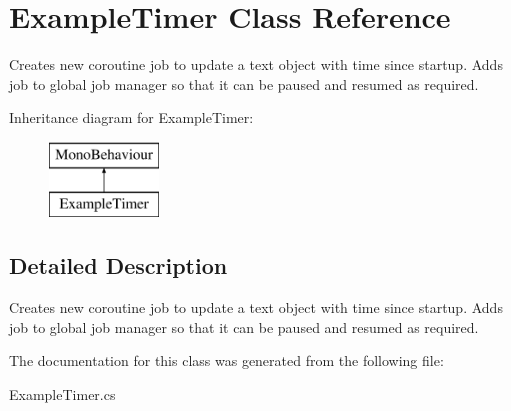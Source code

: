 \hypertarget{class_example_timer}{}\section{Example\+Timer Class Reference}
\label{class_example_timer}


Creates new coroutine job to update a text object with time since startup. Adds job to global job manager so that it can be paused and resumed as required.  


Inheritance diagram for Example\+Timer\+:\begin{figure}[H]
\begin{center}
\leavevmode
\includegraphics[height=2.000000cm]{class_example_timer}
\end{center}
\end{figure}


\subsection{Detailed Description}
Creates new coroutine job to update a text object with time since startup. Adds job to global job manager so that it can be paused and resumed as required. 



The documentation for this class was generated from the following file\+:\begin{DoxyCompactItemize}
\item 
Example\+Timer.\+cs\end{DoxyCompactItemize}
